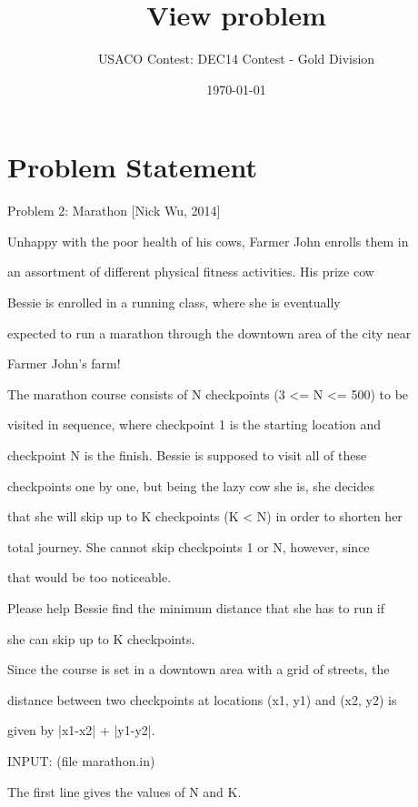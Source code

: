 \documentclass[12pt]{article}
\title{View problem}
\author{USACO Contest: DEC14 Contest - Gold Division}
\date{\today}
\begin{document}
\maketitle

\section*{Problem Statement}

Problem 2: Marathon [Nick Wu, 2014]



Unhappy with the poor health of his cows, Farmer John enrolls them in

an assortment of different physical fitness activities.  His prize cow

Bessie is enrolled in a running class, where she is eventually

expected to run a marathon through the downtown area of the city near

Farmer John's farm!



The marathon course consists of N checkpoints (3 <= N <= 500) to be

visited in sequence, where checkpoint 1 is the starting location and

checkpoint N is the finish.  Bessie is supposed to visit all of these

checkpoints one by one, but being the lazy cow she is, she decides

that she will skip up to K checkpoints (K < N) in order to shorten her

total journey.  She cannot skip checkpoints 1 or N, however, since

that would be too noticeable.



Please help Bessie find the minimum distance that she has to run if

she can skip up to K checkpoints.  



Since the course is set in a downtown area with a grid of streets, the

distance between two checkpoints at locations (x1, y1) and (x2, y2) is

given by |x1-x2| + |y1-y2|.



INPUT: (file marathon.in)



The first line gives the values of N and K.
\end{document}
